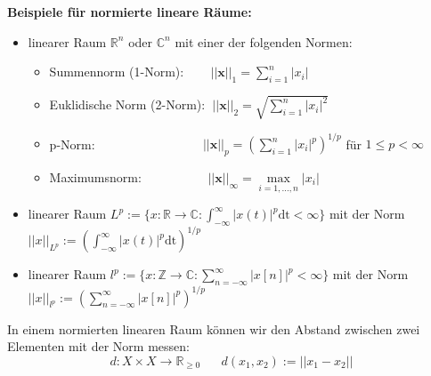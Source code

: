 \documentclass[11pt]{article}
\begin{document}
\textbf{Beispiele für normierte lineare Räume:}
\vspace*{-0.5cm}
\begin{itemize}
    \item linearer Raum $\mathbb{R}^n$ oder $\mathbb{C}^n$ mit einer der folgenden Normen: \begin{itemize}
        \item[] Summennorm (1-Norm): $\hspace{22pt}||\mathbf{x}||_1 = \sum_{i=1}^n |x_i|$
        \item[] Euklidische Norm (2-Norm): $\hspace{3pt}||\mathbf{x}||_2 = \sqrt{\sum_{i=1}^n |x_i|^2}$
        \item[] p-Norm: $\hspace{100pt}||\mathbf{x}||_p = \left(\sum_{i=1}^n |x_i|^p\right)^{1/p}$ für $1\leq p < \infty$
        \item[] Maximumsnorm: $\hspace{60pt}||\mathbf{x}||_\infty = \underset{i=1,\dots,n}{\max}|x_i|$
    \end{itemize}
    \item linearer Raum $L^p := \{ x:\mathbb{R}\to \mathbb{C} : \int_{-\infty}^\infty |x(t)|^p \text{dt} < \infty \} $ mit der Norm $||x||_{L^p} := \left( \int_{-\infty}^\infty |x(t)|^p \text{dt}\right)^{1/p}$
    \item linearer Raum $l^p :=\{ x:\mathbb{Z}\to \mathbb{C} : \sum_{n=-\infty}^\infty |x[n]|^p < \infty \} $ mit der Norm $||x||_{l^p} := \left( \sum_{n=-\infty}^\infty |x[n]|^p \right)^{1/p}$
\end{itemize}

In einem normierten linearen Raum können wir den Abstand zwischen zwei Elementen mit der Norm messen:
$$d:X\times X \to \mathbb{R}_{\geq 0} \hspace{20pt} d(x_1, x_2):= ||x_1 - x_2||$$

\vfill \null
\pagebreak
\end{document}
